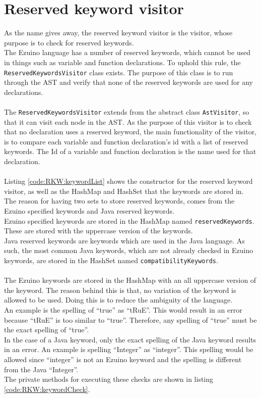 \section{Reserved keyword visitor}
As the name gives away, the reserved keyword visitor is the visitor, whose purpose is to check for reserved keywords.\\
The Ezuino language has a number of reserved keywords, which cannot be used in things such as variable and function declarations. To uphold this rule, the \texttt{ReservedKeywordsVisitor} class exists. The purpose of this class is to run through the AST and verify that none of the reserved keywords are used for any declarations.
\\\\
The \texttt{ReservedKeywordsVisitor} extends from the abstract class \texttt{AstVisitor}, so that it can visit each node in the AST. As the purpose of this visitor is to check that no declaration uses a reserved keyword, the main functionality of the visitor, is to compare each variable and function declaration's id with a list of reserved keywords. The Id of a variable and function declaration is the name used for that declaration.
\\\\
Listing \ref{code:RKW:keywordList} shows the constructor for the reserved keyword visitor, as well as the HashMap and HashSet that the keywords are stored in. The reason for having two sets to store reserved keywords, comes from the Ezuino specified keywords and Java reserved keywords.\\
Ezuino specified keywords are stored in the HashMap named \texttt{reservedKeywords}. These are stored with the uppercase version of the keywords.\\
Java reserved keywords are keywords which are used in the Java language. As such, the most common Java keywords, which are not already checked in Ezuino keywords, are stored in the HashSet named \texttt{compatibilityKeywords}.
\\\\
The Ezuino keywords are stored in the HashMap with an all uppercase version of the keyword. The reason behind this is that, no variation of the keyword is allowed to be used. Doing this is to reduce the ambiguity of the language.\\
An example is the spelling of “true” as “tRuE”. This would result in an error because “tRuE” is too similar to “true”. Therefore, any spelling of “true” must be the exact spelling of “true”.\\
In the case of a Java keyword, only the exact spelling of the Java keyword results in an error. An example is spelling “Integer” as “integer”. This spelling would be allowed since “integer” is not an Ezuino keyword and the spelling is different from the Java “Integer”.\\
The private methods for executing these checks are shown in listing \ref{code:RKW:keywordCheck}.\\


